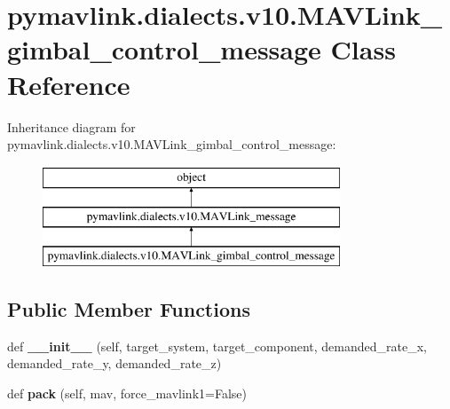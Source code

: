 \hypertarget{classpymavlink_1_1dialects_1_1v10_1_1MAVLink__gimbal__control__message}{}\section{pymavlink.\+dialects.\+v10.\+M\+A\+V\+Link\+\_\+gimbal\+\_\+control\+\_\+message Class Reference}
\label{classpymavlink_1_1dialects_1_1v10_1_1MAVLink__gimbal__control__message}
Inheritance diagram for pymavlink.\+dialects.\+v10.\+M\+A\+V\+Link\+\_\+gimbal\+\_\+control\+\_\+message\+:\begin{figure}[H]
\begin{center}
\leavevmode
\includegraphics[height=3.000000cm]{classpymavlink_1_1dialects_1_1v10_1_1MAVLink__gimbal__control__message}
\end{center}
\end{figure}
\subsection*{Public Member Functions}
\begin{DoxyCompactItemize}
\item 
\mbox{\label{classpymavlink_1_1dialects_1_1v10_1_1MAVLink__gimbal__control__message_a57ac7ba82c7e897a7fcbd8e55ef340a9}} 
def {\bfseries \+\_\+\+\_\+init\+\_\+\+\_\+} (self, target\+\_\+system, target\+\_\+component, demanded\+\_\+rate\+\_\+x, demanded\+\_\+rate\+\_\+y, demanded\+\_\+rate\+\_\+z)
\item 
\mbox{\label{classpymavlink_1_1dialects_1_1v10_1_1MAVLink__gimbal__control__message_a911a349106aa7f89de138774bd18f26c}} 
def {\bfseries pack} (self, mav, force\+\_\+mavlink1=False)
\end{DoxyCompactItemize}
